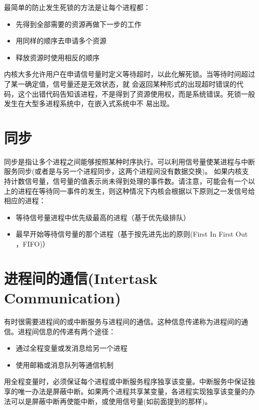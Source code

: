 \documentclass[a4paper,12pt]{report}
\begin{document}
\begin{appendix}
\begin{spacing}{1.5}
\begin{itemize}
\end{itemize}
最简单的防止发生死锁的方法是让每个进程都：
\begin{itemize}
  \item 先得到全部需要的资源再做下一步的工作
  \item 用同样的顺序去申请多个资源
  \item 释放资源时使用相反的顺序
\end{itemize}
内核大多允许用户在申请信号量时定义等待超时，以此化解死锁。当等待时间超过了某一确定值，信号量还是无效状态，就 会返回某种形式的出现超时错误的代码，这个出错代码告知该进程，不是得到了资源使用权，而是系统错误。死锁一般发生在大型多进程系统中，在嵌入式系统中不 易出现。


\end{spacing}


\section{    同步}
\begin{spacing}{1.5}

 同步是指让多个进程之间能够按照某种时序执行。可以利用信号量使某进程与中断服务同步(或者是与另一个进程同步，这两个进程间没有数据交换)。
    如果内核支持计数信号量，信号量的值表示尚未得到处理的事件数。请注意，可能会有一个以上的进程在等待同一事件的发生，则这种情况下内核会根据以下原则之一发信号给相应的进程：

\begin{itemize}
  \item 	等待信号量进程中优先级最高的进程（基于优先级排队）
  \item 	最早开始等待信号量的那个进程（基于按先进先出的原则(First In First Out ，FIFO)）
\end{itemize}


\end{spacing}

\section{    进程间的通信(Intertask Communication)}
\begin{spacing}{1.5}
  有时很需要进程间的或中断服务与进程间的通信。这种信息传递称为进程间的通信。进程间信息的传递有两个途径：
\begin{itemize}
  \item 		通过全程变量或发消息给另一个进程
  \item 		使用邮箱或消息队列等通信机制
\end{itemize}
    用全程变量时，必须保证每个进程或中断服务程序独享该变量。中断服务中保证独享的唯一办法是屏蔽中断。如果两个进程共享某变量，各进程实现独享该变量的办法可以是屏蔽中断再使能中断，或使用信号量(如前面提到的那样)。


\end{spacing}
\end{appendix}
\end{document}
